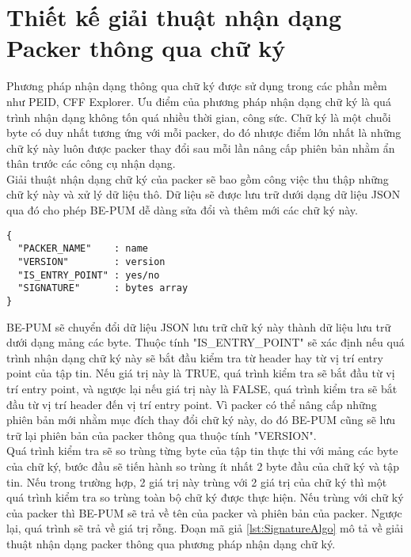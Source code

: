 \section{Thiết kế giải thuật nhận dạng Packer thông qua chữ ký}

\hspace{0.5cm}Phương pháp nhận dạng thông qua chữ ký được sử dụng trong các phần mềm như PEID, CFF Explorer. Ưu điểm của phương pháp nhận dạng chữ ký là quá trình nhận dạng không tốn quá nhiều thời gian, công sức. Chữ ký là một chuỗi byte có duy nhất tương ứng với mỗi packer, do đó nhược điểm lớn nhất là những chữ ký này luôn được packer thay đổi sau mỗi lần nâng cấp phiên bản nhằm ẩn thân trước các công cụ nhận dạng.\\

\hspace{0.5cm}Giải thuật nhận dạng chữ ký của packer sẽ bao gồm công việc thu thập những chữ ký này và xử lý dữ liệu thô. Dữ liệu sẽ được lưu trữ dưới dạng dữ liệu JSON qua đó cho phép BE-PUM dễ dàng sửa đổi và thêm mới các chữ ký này.

\begin{code}
\begin{lstlisting}[captionpos=b,caption={Cấu trúc lưu trữ của một chữ ký},frame=single]
{
  "PACKER_NAME"    : name
  "VERSION"        : version
  "IS_ENTRY_POINT" : yes/no
  "SIGNATURE"      : bytes array
}
\end{lstlisting}
\end{code}

\hspace{0.5cm}BE-PUM sẽ chuyển đổi dữ liệu JSON lưu trữ chữ ký này thành dữ liệu lưu trữ dưới dạng mảng các byte. Thuộc tính "IS\_ENTRY\_POINT" sẽ xác định nếu quá trình nhận dạng chữ ký này sẽ bắt đầu kiểm tra từ header hay từ vị trí entry point của tập tin. Nếu giá trị này là TRUE, quá trình kiểm tra sẽ bắt đầu từ vị trí entry point, và ngược lại nếu giá trị này là FALSE, quá trình kiểm tra sẽ bắt đầu từ vị trí header đến vị trí entry point. Vì packer có thể nâng cấp những phiên bản mới nhằm mục đích thay đổi chữ ký này, do đó BE-PUM cũng sẽ lưu trữ lại phiên bản của packer thông qua thuộc tính "VERSION".\\ 

\hspace{0.5cm}Quá trình kiểm tra sẽ so trùng từng byte của tập tin thực thi với mảng các byte của chữ ký, bước đầu sẽ tiến hành so trùng ít nhất 2 byte đầu của chữ ký và tập tin. Nếu trong trường hợp, 2 giá trị này trùng với 2 giá trị của chữ ký thì một quá trình kiểm tra so trùng toàn bộ chữ ký được thực hiện. Nếu trùng với chữ ký của packer thì BE-PUM sẽ trả về tên của packer và phiên bản của packer. Ngược lại, quá trình sẽ trả về giá trị rỗng. Đoạn mã giả \ref {lst:SignatureAlgo} mô tả về giải thuật nhận dạng packer thông qua phương pháp nhận dạng chữ ký.

